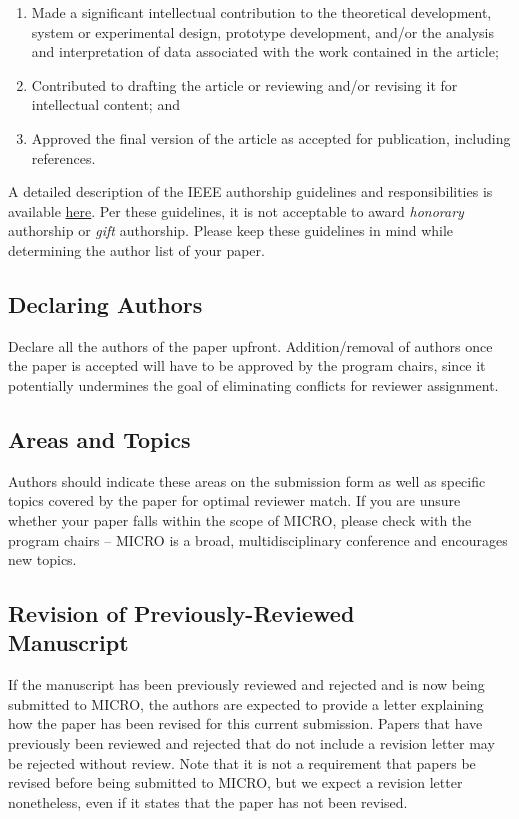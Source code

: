 \documentclass{sig-alternate}
\begin{document}
\begin{enumerate}
\item Made a significant intellectual contribution to the theoretical development, system or experimental design, prototype development, and/or the analysis and interpretation of data associated with the work contained in the article;

\item Contributed to drafting the article or reviewing and/or revising it for intellectual content; and

\item Approved the final version of the article as accepted for publication, including references.
\end{enumerate}

A detailed description of the IEEE authorship guidelines and responsibilities is available \href{https://www.ieee.org/publications_standards/publications/rights/Section821.html}{here}. Per these guidelines, it is not acceptable to award {\em honorary } authorship or {\em gift} authorship. Please keep these guidelines in mind while determining the author list of your paper.

\subsection{Declaring Authors}
Declare all the authors of the paper upfront. Addition/removal of authors once the paper is accepted will have to be approved by the program chairs, since it potentially undermines the goal of eliminating conflicts for reviewer assignment.

\subsection{Areas and Topics}
Authors should indicate these areas on the submission form as well as specific topics covered by the paper for optimal reviewer match. If you are unsure whether your paper falls within the scope of MICRO, please check with the program chairs -- MICRO is a broad, multidisciplinary conference and encourages new topics.

\subsection{Revision of Previously-Reviewed\\ Manuscript}
If the manuscript has been previously reviewed and rejected and is now being submitted to MICRO, the authors are expected to provide a letter explaining how the paper has been revised for this current submission. Papers that have previously been reviewed and rejected that do not include a revision letter may be rejected without review. Note that it is not a requirement that papers be revised before being submitted to MICRO, but we expect a revision letter nonetheless, even if it states that the paper has not been revised. 
\end{document}

